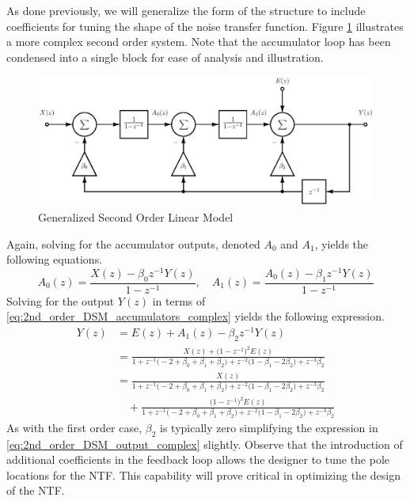 As done previously, we will generalize the form of the structure to include
coefficients for tuning the shape of the noise transfer function. Figure
\ref{fig:linear_z_model_2nd_order_complex} illustrates a more complex second
order system. Note that the accumulator loop has been condensed into a single block
for ease of analysis and illustration.
\begin{figure}
  \centering
  \includegraphics[width=\textwidth]{./final_figures/second_order_complex_model.eps}
  \caption{Generalized Second Order Linear Model}
  \label{fig:linear_z_model_2nd_order_complex}
\end{figure}
Again, solving for the accumulator outputs, denoted $A_{0}$ and $A_{1}$, yields
the following equations.
\begin{equation}\label{eq:2nd_order_DSM_accumulators_complex}
  A_{0}(z) = \frac{X(z)-\beta_0 z^{-1}Y(z)}{1-z^{-1}} ,\quad
  A_{1}(z) = \frac{A_{0}(z)-\beta_1 z^{-1}Y(z)}{1-z^{-1}}
\end{equation}
Solving for the output $Y(z)$ in terms of
\eqref{eq:2nd_order_DSM_accumulators_complex} yields the following expression.
\begin{equation}\label{eq:2nd_order_DSM_output_complex}
 \begin{split}
  Y(z) &= E(z)+A_1(z)-\beta_2 z^{-1}Y(z) \\
       &= \frac{X(z)+ \bigl(1-z^{-1}\bigr)^2 E(z)}
{ 1+ z^{-1}\bigl(-2+\beta_0+\beta_1+\beta_2\bigr)
   + z^{-2}\bigl(1-\beta_1-2\beta_2\bigr)
   + z^{-3}\beta_2}\\
       &= \frac{X(z)}{
  1+ z^{-1}\bigl(-2+\beta_0+\beta_1+\beta_2\bigr)
   + z^{-2}\bigl(1-\beta_1-2\beta_2\bigr)
   + z^{-3}\beta_2}\\ 
       &\quad + \frac{\bigl(1-z^{-1}\bigr)^2 E(z)}{
  1+ z^{-1}\bigl(-2+\beta_0+\beta_1+\beta_2\bigr)
   + z^{-2}\bigl(1-\beta_1-2\beta_2\bigr)
   + z^{-3}\beta_2}
 \end{split}
\end{equation}
As with the first order case, $\beta_2$ is typically zero simplifying the
expression in \eqref{eq:2nd_order_DSM_output_complex} slightly. Observe that the
introduction of additional coefficients in the feedback loop allows the designer to tune
the pole locations for the NTF. This capability will prove critical in optimizing the
design of the NTF.


